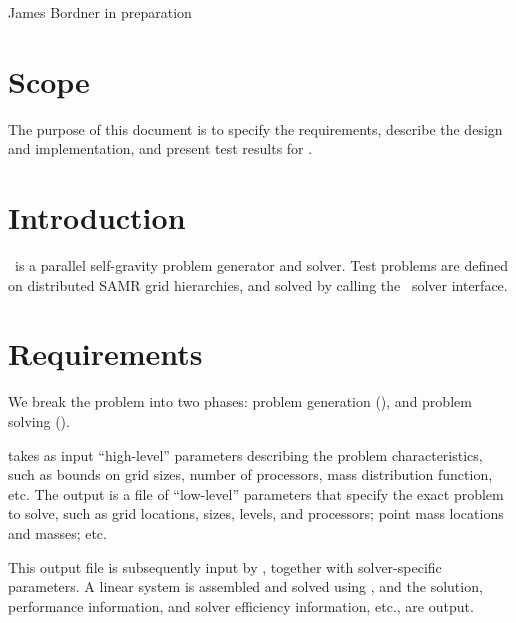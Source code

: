 \documentclass[11pt]{article}
\begin{document}
      {James Bordner}
      {in preparation}

\section{Scope}

   The purpose of this document is to specify the requirements,
   describe the design and implementation, and present test results
   for \hypregrav.

\section{Introduction}

\hypregrav\ is a parallel self-gravity problem generator and solver.
Test problems are defined on distributed SAMR grid hierarchies, and
solved by calling the  \hypre\ solver interface.

\section{Requirements} \label{s:requirements}

We break the problem into two phases: problem generation
(), and problem solving
().  

 takes as input ``high-level'' parameters
describing the problem characteristics, such as bounds on grid sizes,
number of processors, mass distribution function, etc.  The output is
a file of ``low-level'' parameters that specify the exact problem to
solve, such as grid locations, sizes, levels, and processors; point
mass locations and masses; etc.

This output file is subsequently input by , together
with solver-specific parameters.  A linear system is assembled and
solved using \hypre, and the solution, performance information, and
solver efficiency information, etc., are output.
\end{document}
